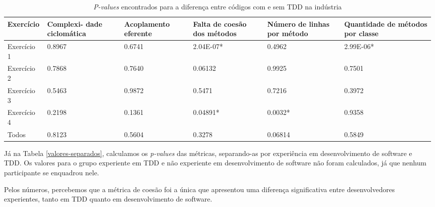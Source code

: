 \documentclass[conference]{IEEEtran}
\begin{document}
\begin{table*}
	\centering
	\begin{tabular}{ | p{3cm} | p{2cm} | p{2cm} | p{2cm} | p{2cm} | p{2cm} |}
		\hline
		\textbf{Exercício} & \textbf{Complexi-} \textbf{dade ciclomática} & \textbf{Acoplamento eferente} & \textbf{Falta de coesão dos métodos} & \textbf{Número de linhas por método} 
		& \textbf{Quantidade de métodos por classe} \\
		\hline
		Exercício 1 &	0.8967	&	0.6741 &	\cellcolor[gray]{0.8}2.04E-07* &	0.4962 &	\cellcolor[gray]{0.8}2.99E-06* \\
		Exercício 2	& 0.7868	&	0.7640 &	0.06132 &	0.9925 &	0.7501 \\
		Exercício 3	& 0.5463	&	0.9872 &	0.5471 &	0.7216 &	0.3972\\
		Exercício 4	& 0.2198	&	0.1361 &	\cellcolor[gray]{0.8}0.04891* &	\cellcolor[gray]{0.8}0.0032* &	0.9358\\
		\hline
		Todos &	0.8123	&	0.5604 &	0.3278 &	0.06814 &	0.5849\\
		\hline
	\end{tabular}
	\caption{\textit{P-values} encontrados para a diferença entre códigos com e sem TDD na indústria}
	\label{metricas-industria}
\end{table*}

Já na Tabela \ref{valores-separados},
calculamos os \textit{p-values} das métricas, separando-as 
por experiência em desenvolvimento de software e TDD. Os valores para o grupo
experiente em TDD e não experiente em desenvolvimento de software não foram calculados, já que nenhum
participante se enquadrou nele.

Pelos números, percebemos 
que a métrica de coesão foi a única que apresentou uma diferença significativa entre desenvolvedores
experientes, tanto em TDD quanto em desenvolvimento de software.
\end{document}
